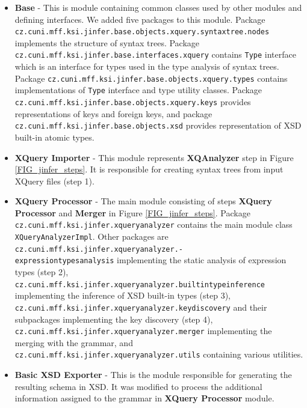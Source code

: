 \begin{itemize}
\item \textbf{Base} - This is module containing common classes used by other modules and defining interfaces. We added five packages to this module. Package \texttt{cz.cuni.mff.ksi.jinfer.base.objects.xquery.syntaxtree.nodes} implements the structure of syntax trees. Package \texttt{cz.cuni.mff.ksi.jinfer\-.base.interfaces.xquery} contains \texttt{Type} interface which is an interface for types used in the type analysis of syntax trees. Package \texttt{cz.cuni.mff.ksi\-.jinfer.base\-.objects.xquery.types} contains implementations of \texttt{Type} interface and type utility classes. Package \texttt{cz.cuni.mff.ksi.jinfer\-.base\-.objects.xquery.keys} provides representations of keys and foreign keys, and package \texttt{cz.cuni.mff.ksi\-.jinfer.base.objects.xsd} provides representation of XSD built-in atomic types.
\item \textbf{XQuery Importer} - This module represents \textbf{XQAnalyzer} step in Figure \ref{FIG_jinfer_steps}. It is responsible for creating syntax trees from input XQuery files (step 1).
\item \textbf{XQuery Processor} - The main module consisting of steps \textbf{XQuery Processor} and \textbf{Merger} in Figure \ref{FIG_jinfer_steps}. Package \texttt{cz.cuni.mff.ksi.jinfer\-.xqueryanalyzer} contains the main module class \texttt{XQueryAnalyzerImpl}. Other packages are \texttt{cz.cuni.mff.ksi.jinfer.xqueryanalyzer.-\\expressiontypesanalysis} implementing the static analysis of expression types (step 2), \texttt{cz.cuni.mff.ksi.jinfer.xqueryanalyzer.builtintype\-inference} implementing the inference of XSD built-in types (step 3), \texttt{cz\-.cuni.mff\-.ksi.jinfer\-.xqueryanalyzer.keydiscovery} and their subpackages implementing the key discovery (step 4), \texttt{cz.cuni.mff.ksi.jinfer\-.xqueryanalyzer.merger} implementing the merging with the grammar, and \texttt{cz.cuni.mff.ksi.jinfer.xqueryanalyzer.utils} containing various utilities.
\item \textbf{Basic XSD Exporter} - This is the module responsible for generating the resulting schema in XSD. It was modified to process the additional information assigned to the grammar in \textbf{XQuery Processor} module.
\end{itemize}